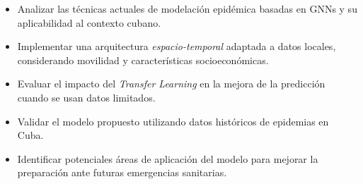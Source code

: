 \begin{itemize}

\item Analizar las técnicas actuales de modelación epidémica basadas en GNNs y su aplicabilidad al contexto cubano.

\item Implementar una arquitectura \textit{espacio-temporal} adaptada a datos locales, considerando movilidad y características socioeconómicas.

\item Evaluar el impacto del \textit{Transfer Learning} en la mejora de la predicción cuando se usan datos limitados.

\item Validar el modelo propuesto utilizando datos históricos de epidemias en Cuba.

\item Identificar potenciales áreas de aplicación del modelo para mejorar la preparación ante futuras emergencias sanitarias.

\end{itemize}
